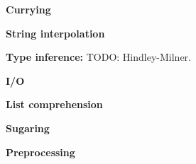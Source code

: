 \textbf{Currying}

\textbf{String interpolation}

\textbf{Type inference:} TODO: Hindley-Milner.

\textbf{I/O}

\textbf{List comprehension}

\textbf{Sugaring}

\textbf{Preprocessing}






